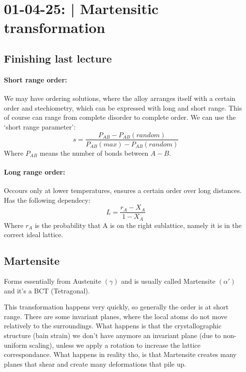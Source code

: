 \section{01-04-25: | Martensitic transformation}

\subsection{Finishing last lecture}
\paragraph{Short range order:}
We may have ordering solutions, where the alloy arranges itself with a certain order and stechiometry, which can be expressed with long and short range. This of course can range from complete disorder to complete order.
We can use the `short range parameter':
\begin{equation}
    s = \frac{P_{AB} - P_{AB}(random)}{P_{AB}(max) - P_{AB}(random)}
\end{equation}
Where $P_{AB}$ means the number of bonds between $A-B$. 
\paragraph{Long range order:} Occours only at lower temperatures, ensures a certain order over long distances. Has the following dependecy:
\begin{equation}
    L = \frac{r_A - X_A}{1 - X_A}
\end{equation}
Where $r_A$ is the probability that A is on the right sublattice, namely it is in the correct ideal lattice.

\subsection{Martensite}

Forms essentially from Austenite $(\gamma)$ and is usually called Martensite $(\alpha')$ and it's a BCT (Tetragonal).

This transformation happens very quickly, so generally the order is at short range.
There are some invariant planes, where the local atoms do not move relatively to the surroundings.
What happens is that the crystallographic structure (bain strain) we don't have anymore an invariant plane (due to non-uniform scaling), unless we apply a rotation to increase the lattice correspondance.
What happens in reality tho, is that Martensite creates many planes that shear and create many deformations that pile up.


